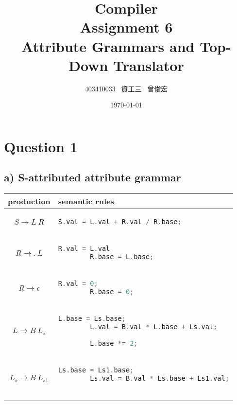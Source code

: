 \documentclass[12pt, A4]{article}
\title{Compiler \\ Assignment 6 \\ Attribute Grammars and Top-Down Translator}
\author{403410033 \ 資工三 \ 曾俊宏}
\date{\today}
\begin{document}
	
	\maketitle
	\newpage

	\section{Question 1}
	
	\subsection*{a) S-attributed attribute grammar}
    
    \begin{tabular}{|c|l|}
        \hline 
        production & semantic rules\\
        \hline 
        $S \rightarrow L\ R$& 
        \begin{lstlisting}[language=c]
        S.val = L.val + R.val / R.base;
        \end{lstlisting}
        \\ 
        \hline 
        $R \rightarrow .\ L$& 
        \begin{lstlisting}[language=c]
        R.val = L.val
        R.base = L.base;
        \end{lstlisting}
        \\ 
        \hline 
        $R \rightarrow \epsilon$& 
        \begin{lstlisting}[language=c]
        R.val = 0;
        R.base = 0;
        \end{lstlisting}
        \\ 
        \hline 
        $L \rightarrow B\ L_s$&
        \begin{lstlisting}[language=c]
        L.base = Ls.base;
        L.val = B.val * L.base + Ls.val;
        
        L.base *= 2;
        \end{lstlisting}
        \\ 
        \hline 
        $L_s \rightarrow B\ L_{s1}$&
        \begin{lstlisting}[language=c]
        Ls.base = Ls1.base;
        Ls.val = B.val * Ls.base + Ls1.val;
        

\end{lstlisting}
\end{tabular}
\end{document}
